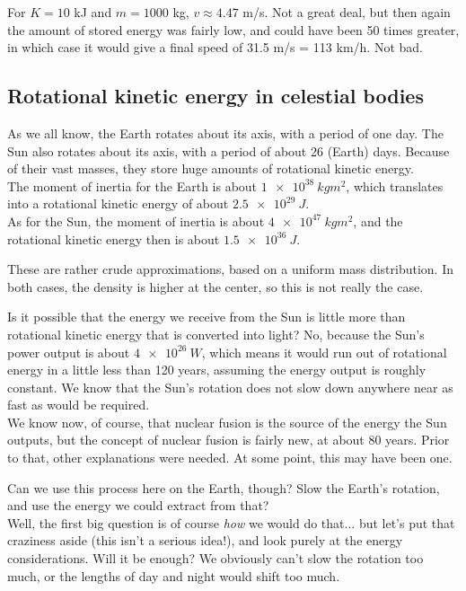 For $K = 10$ kJ and $m = 1000$ kg, $v \approx 4.47$ m/s. Not a great deal, but then again the amount of stored energy was fairly low, and could have been 50 times greater, in which case it would give a final speed of 31.5 m/s = 113 km/h. Not bad.

\subsection{Rotational kinetic energy in celestial bodies}

As we all know, the Earth rotates about its axis, with a period of one day. The Sun also rotates about its axis, with a period of about 26 (Earth) days. Because of their vast masses, they store huge amounts of rotational kinetic energy.\\
The moment of inertia for the Earth is about $\SI{1e38}{kg m^2}$, which translates into a rotational kinetic energy of about $\SI{2.5e29}{J}$.\\
As for the Sun, the moment of inertia is about $\SI{4e47}{kg m^2}$, and the rotational kinetic energy then is about $\SI{1.5e36}{J}$.

These are rather crude approximations, based on a uniform mass distribution. In both cases, the density is higher at the center, so this is not really the case.

Is it possible that the energy we receive from the Sun is little more than rotational kinetic energy that is converted into light? No, because the Sun's power output is about $\SI{4e26}{W}$, which means it would run out of rotational energy in a little less than 120 years, assuming the energy output is roughly constant. We know that the Sun's rotation does not slow down anywhere near as fast as would be required.\\
We know now, of course, that nuclear fusion is the source of the energy the Sun outputs, but the concept of nuclear fusion is fairly new, at about 80 years. Prior to that, other explanations were needed. At some point, this may have been one.

Can we use this process here on the Earth, though? Slow the Earth's rotation, and use the energy we could extract from that?\\
Well, the first big question is of course \emph{how} we would do that... but let's put that craziness aside (this isn't a serious idea!), and look purely at the energy considerations. Will it be enough? We obviously can't slow the rotation too much, or the lengths of day and night would shift too much.

